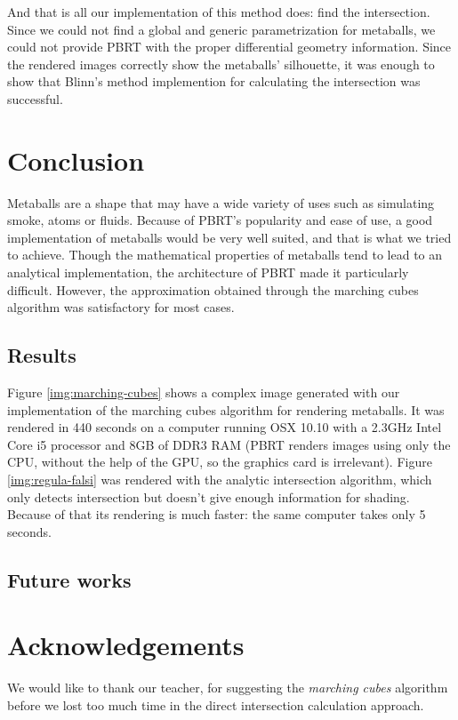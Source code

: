 \documentclass[conference]{acmsiggraph}
\begin{document}
And that is all our implementation of this method does: find the intersection.
Since we could not find a global and generic parametrization for metaballs, we
could not provide PBRT with the proper differential geometry information. Since
the rendered images correctly show the metaballs' silhouette, it was enough to
show that Blinn's method implemention for calculating the intersection was
successful.

\section{Conclusion}

Metaballs are a shape that may have a wide variety of uses such as simulating smoke, atoms or fluids. Because of PBRT's popularity and ease of use, a good implementation of metaballs would be very well suited, and that is what we tried to achieve. Though the mathematical properties of metaballs tend to lead to an analytical implementation, the architecture of PBRT made it particularly difficult. However, the approximation obtained through the marching cubes algorithm was satisfactory for most cases.

\subsection{Results}

Figure \ref{img:marching-cubes} shows a complex image generated with our implementation of the marching cubes algorithm for rendering metaballs. It was rendered in 440 seconds on a computer running OSX 10.10 with a 2.3GHz Intel Core i5 processor and 8GB of DDR3 RAM (PBRT renders images using only the CPU, without the help of the GPU, so the graphics card is irrelevant). Figure \ref{img:regula-falsi} was rendered with the analytic intersection algorithm, which only detects intersection but doesn't give enough information for shading. Because of that its rendering is much faster: the same computer takes only 5 seconds.


\subsection{Future works}

\section*{Acknowledgements}

We would like to thank our teacher, for suggesting the \textit{marching cubes}
algorithm before we lost too much time in the direct intersection calculation
approach.



\end{document}
